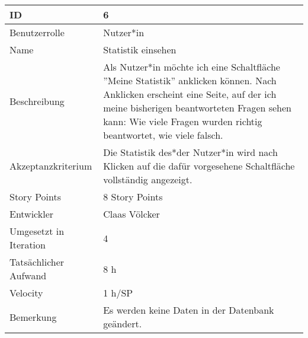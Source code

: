 \begin{tabularx}{\textwidth}{|p{}|X|}
	\hline
	ID & 6\\
	\hline
	Benutzerrolle & Nutzer*in\\
	\hline
	Name & Statistik einsehen\\
	\hline
	Beschreibung & Als Nutzer*in möchte ich eine Schaltfläche ''Meine Statistik'' anklicken können. Nach Anklicken erscheint eine Seite, auf der ich meine bisherigen beantworteten Fragen sehen kann: Wie viele Fragen wurden richtig beantwortet, wie viele falsch.\\
	\hline
	Akzeptanzkriterium & Die Statistik des*der Nutzer*in wird nach Klicken auf die dafür vorgesehene Schaltfläche vollständig angezeigt.\\
	\hline
	Story Points & 8 Story Points\\
	\hline
	Entwickler & Claas Völcker\\
	\hline
	Umgesetzt in Iteration & 4\\
	\hline
	Tatsächlicher Aufwand & 8 h\\
	\hline
	Velocity & 1 h/SP\\
	\hline
	Bemerkung &  Es werden keine Daten in der Datenbank geändert.\\
	\hline
\end{tabularx}
\vspace{20pt}
